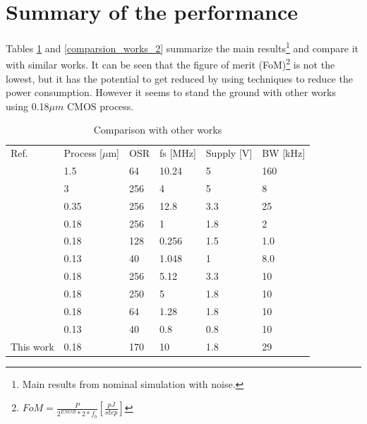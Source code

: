 \section{Summary of the performance }
Tables \ref{comparsion_works} and \ref{comparsion_works_2} summarize the main results\footnote{Main results from nominal simulation with noise.} and compare it with similar works. It can be seen that the figure of merit (FoM)\footnote{$FoM = \frac{P}{2^{ENOB}*2*f_b}[\frac{pJ}{step}]$} is not the lowest, but it has the potential to get reduced by using techniques to reduce the power consumption. However it seems to stand the ground with other works using 0.18$\mu m$ CMOS process. 


\begin{table}[H]
\centering
\caption{Comparison with other works}
\label{comparsion_works}
\begin{tabular}{l|l|l|l|l|l}
\hline
\multirow{1}{*}{Ref.} & \multicolumn{1}{c|}{Process [$\mu$m]} & \multicolumn{1}{c|}{OSR} & \multicolumn{1}{c|}{fs [MHz]} & \multicolumn{1}{c|}{Supply [V]} & \multicolumn{1}{c}{BW [kHz]}  \\\cline{1-6}

            \cite{ref_1} & 1.5 & 64 & 10.24 & 5 & 160\\
            \cite{ref_2} & 3 & 256 & 4 & 5 & 8\\
            \cite{ref_3} & 0.35 & 256 & 12.8 & 3.3 & 25\\
            \cite{SQNR} & 0.18 & 256 & 1 & 1.8 & 2 \\
            \cite{ref_4} & 0.18 & 128 & 0.256 & 1.5 & 1.0\\ 
            \cite{ref_5} & 0.13 & 40 & 1.048 & 1 & 8.0 \\
            \cite{ref_6} & 0.18 & 256 & 5.12 & 3.3 & 10\\
            \cite{ref_7} & 0.18 & 250 & 5 & 1.8 & 10\\
            \cite{ref_8} & 0.18 & 64 & 1.28 & 1.8 & 10\\
            \cite{ref_9} & 0.13 & 40 & 0.8& 0.8& 10 \\
            This work & 0.18 & 170 & 10 & 1.8 & 29\\

\hline            
\end{tabular}
\end{table}



